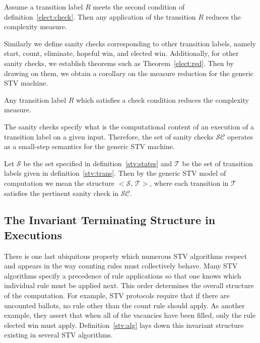 \documentclass{llncs}
\begin{document}
\begin{theorem}\label{elect:red}
Assume a transition label $R$ meets the second condition of definition~\ref{elect:check}. Then any application of the transition $R$ reduces the complexity measure.
\end{theorem}
Similarly we define sanity checks corresponding to other transition labels, namely start, count, eliminate, hopeful win, and elected win. Additionally, for other sanity checks, we establish theorems such as Theorem~\ref{elect:red}. Then by drawing on them, we obtain a corollary on the measure reduction for the generic STV machine. 
\begin{corollary}\label{measure:reduction}
Any transition label $R$ which satisfies a check condition reduces the complexity measure.
\end{corollary}  


The sanity checks specify what is the computational content of an execution of a transition label on a given input. Therefore, the set of sanity checks $\mathcal{SC}$ operates as a small-step semantics for the generic STV machine. 

\begin{definition}
Let $\mathcal{S}$ be the set specified in definition~\ref{stv:states} and $\mathcal{T}$ be the set of transition labels given in definition~\ref{stv:trans}. Then by the generic STV model of computation we mean the structure $<\mathcal{S}$, $\mathcal{T}>$, where each transition in $\mathcal{T}$ satisfies the pertinent sanity check in $\mathcal{SC}$. 
\end{definition}
\subsection{The Invariant Terminating Structure in Executions}
There is one last ubiquitous property which numerous STV algorithms respect and appears in the way counting rules must collectively behave. Many STV algorithms specify a precedence of rule applications so that one knows which individual rule must be applied next. This order determines the overall structure of the computation. For example, STV protocols require that if there are uncounted ballots, no rule other than the count rule should apply. As another example, they assert that when all of the vacancies have been filled, only the rule elected win must apply. Definition~\ref{stv:alg} lays down this invariant structure existing in several STV algorithms. 
\end{document}
